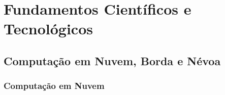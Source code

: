\chapter{Fundamentos Científicos e Tecnológicos}


\section{Computação em Nuvem, Borda e Névoa}







\subsection{Computação em Nuvem}

